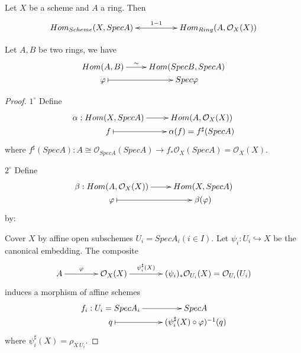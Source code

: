 \begin{prop}
Let $X$ be a scheme and $A$ a ring. Then
\[ \xymatrix@C=5em{
   {Hom_{Scheme}(X,SpecA)} \ar@{<->}[r]^-{1-1} & {Hom_{Ring}(A,\mathcal {O}_X(X))}
}  \]
\end{prop}
\begin{remark}
Let $A,B$ be two rings, we have
\[ \xymatrix@R=0em{
   Hom(A,B) \ar[r]^-{\sim} & Hom(SpecB,SpecA) \\
   \varphi \ar@{|->}[r] & Spec\varphi }  \]
\end{remark}
\begin{proof}
$\mathit{1^{\circ}}$ Define
\[ \xymatrix@R=0em{
   {\alpha:Hom(X,SpecA)} \ar[r] & {Hom(A,\mathcal {O}_X(X))}  \\
   f \ar@{|->}[r] & {\alpha(f)=f^{\sharp}(SpecA)} }  \]
where $f^{\sharp}(SpecA):A\cong \mathcal
{O}_{SpecA}(SpecA)\rightarrow f_{\ast}\mathcal {O}_X(SpecA)=\mathcal
{O}_X(X).$

$\mathit{2^{\circ}}$ Define
\[ \xymatrix@R=0em{
   {\beta:Hom(A,\mathcal {O}_X(X))} \ar[r] & Hom(X,SpecA)  \\
   \varphi \ar@{|->}[r] & {\beta(\varphi)} }  \]
by:

Cover $X$ by affine open subschemes $U_i=SpecA_i(i\in I).$ Let
$\psi_i: U_i\hookrightarrow X$ be the canonical embedding. The
composite
\[ \xymatrix@C=4em{
   A \ar[r]^-{\varphi} & \mathcal {O}_X(X)
   \ar[r]^-{\psi_i^{\sharp}(X)} & {(\psi_i)_{\ast}\mathcal {O}_{U_i}(X) = \mathcal
   {O}_{U_i}(U_i)} }  \]
induces a morphism of affine schemes
\[ \xymatrix@R=0em{
   {f_i:U_i=SpecA_i} \ar[r] & SpecA           \\
   q \ar@{|->}[r] & {(\psi_i^{\sharp}(X)\circ\varphi)^{-1}(q)} } \]
where $\psi_i^{\sharp}(X)=\rho_{X\,U_i}.$


\end{proof}
